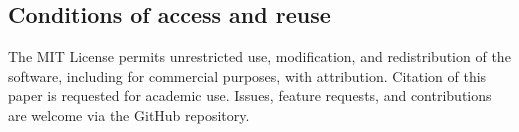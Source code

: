 \subsection*{Conditions of access and reuse}

The MIT License permits unrestricted use, modification, and redistribution of the software, including for commercial purposes, with attribution. Citation of this paper is requested for academic use. Issues, feature requests, and contributions are welcome via the GitHub repository.

